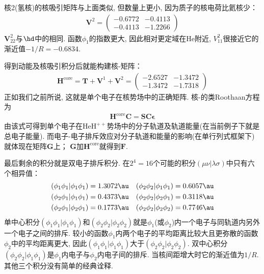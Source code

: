 核2(氢核)的核吸引矩阵与上面类似, 
但数量上更小, 
因为质子的核电荷比氦核少：
\begin{align}
	\mathbf{V}^2 = 
	\begin{pmatrix}
		-0.6772&-0.4113\\-0.4113&-1.2266
	\end{pmatrix}
\end{align}
$\mathbf{V}_{22}^2$与$\hd$中的相同.
函数$\phi_1$的指数更大, 因此相对更定域在$\mathrm{He}$附近,
$V_{11}^2$很接近它的渐近值$-1/R=-0.6834$.

得到动能及核吸引积分后就能构建核-\ha 矩阵：
\begin{align}
	\mathbf{H}^\mathrm{core} = \mathbf{T+V}^1 + \mathbf{V}^2=
	\begin{pmatrix}
		-2.6527&-1.3472\\-1.3472&-1.7318
	\end{pmatrix}
\end{align}
正如我们之前所说, 
这就是单个电子在核势场中的正确\ha 矩阵. 
核-\ha 的类Roothaan方程为
\begin{align}
	\mathbf{H}^\mathrm{core}\mathbf{C=SC}\bm{\epsilon}
\end{align}
由该式可得到单个电子在$\mathrm{HeH}^{++}$势场中的分子轨道及轨道能量(在当前例子下就是总电子能量). 
而电子-电子排斥效应对分子轨道和能量的影响(在单行列式框架下)就体现在矩阵$\mathbf{G}$上；
$\mathbf{G}$加$\mathbf{H}^\mathrm{core}$就得到$\mathbf{F}$.


最后剩余的积分就是双电子排斥积分. 
在$2^4=16$个可能的积分$(\mu\nu|\lambda\sigma)$中只有六个相异值：
\begin{align*}
	(\phi_1\phi_1|\phi_1\phi_1)&=1.3072\au& (\phi_2\phi_2|\phi_1\phi_1)&=0.6057\au\\
	(\phi_2\phi_1|\phi_1\phi_1)&=0.4373\au& (\phi_2\phi_2|\phi_2\phi_1)&=0.3118\au\\
	(\phi_2\phi_1|\phi_2\phi_1)&=0.1773\au& (\phi_2\phi_2|\phi_2\phi_2)&=0.7746\au\\
\end{align*}
单中心积分$(\phi_1\phi_1|\phi_1\phi_1)$和$(\phi_2\phi_2|\phi_2\phi_2)$就是$\phi_1$(或$\phi_2$)内一个电子与同轨道内另外一个电子之间的排斥. 
较小的函数$\phi_1$内两个电子的平均距离比较大且更弥散的函数$\phi_2$中的平均距离更大, 
因此$(\phi_1\phi_1|\phi_1\phi_1)$大于$(\phi_2\phi_2|\phi_2\phi_2)$. 
双中心积分$(\phi_2\phi_2|\phi_1\phi_1)$是$\phi_1$内电子与$\phi_2$内电子间的排斥. 
当核间距增大时它的渐近值为$1/R$. 
其他三个积分没有简单的经典诠释.


